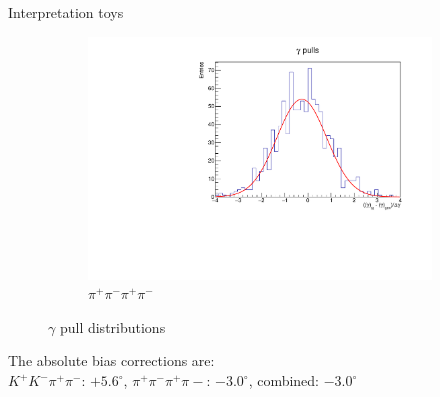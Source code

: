 \documentclass[xcolor={dvipsnames}]{beamer}
\begin{document}
\begin{frame}{Interpretation toys}
\begin{figure}
\begin{subfigure}{0.5\textwidth}
      \includegraphics[width=1.0\textwidth]{Plots/gamma_pull_toys_pipipipi.pdf}
      \vspace{-0.3cm}
      \caption*{$\pi^+\pi^-\pi^+\pi^-$}
    \end{subfigure}
    \vspace{-0.5cm}
    \caption*{$\gamma$ pull distributions}
  \end{figure}
  \vspace{-0.3cm}
  \begin{center}
    The absolute bias corrections are:\\
    $K^+K^-\pi^+\pi^-$: $+5.6^\circ$, $\pi^+\pi^-\pi^+\pi-$: $-3.0^\circ$, combined: $-3.0^\circ$
  \end{center}
\end{frame}
\end{document}
